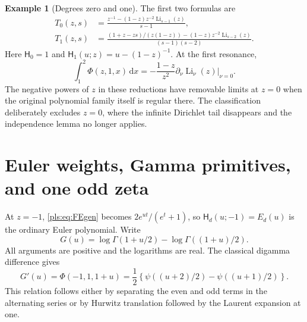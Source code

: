 \documentclass[11pt,letterpaper]{article}
\numberwithin{equation}{section}
\theoremstyle{definition}
\newtheorem{example}[theorem]{Example}
\theoremstyle{remark}\newtheorem{remark}[theorem]{Remark}
\newcommand{\dd}{\,\mathrm d}
\newcommand{\Li}{\operatorname{Li}}
\newcommand{\HFE}{\mathsf H}
\begin{document}
\begin{example}[Degrees zero and one]
The first two formulas are
\begin{align}
 T_0(z,s)&=\frac{z^{-1}-(1-z)z^{-2}\Li_{s-1}(z)}{s-1},
                                  \label{pls:eq:d0}\\
 T_1(z,s)&=\frac{(1+z-zs)/(z(1-z))
                      -(1-z)z^{-2}\Li_{s-2}(z)}{(s-1)(s-2)}.
                                  \label{pls:eq:d1}
\end{align}
Here $\HFE_0=1$ and $\HFE_1(u;z)=u-(1-z)^{-1}$.
At the first resonance,
\begin{equation}\label{pls:eq:d0res}
 \int_1^2\Phi(z,1,x)\dd x
       =-\frac{1-z}{z^2}
                       \left.\partial_\nu\Li_\nu(z)\right|_{\nu=0}.
\end{equation}
The negative powers of $z$ in these reductions have removable limits
at $z=0$ when the original polynomial family itself is regular there.
The classification deliberately excludes $z=0$, where the infinite
Dirichlet tail disappears and the independence lemma no longer applies.
\end{example}

\section{Euler weights, Gamma primitives, and one odd zeta}
\label{pls:sec:gamma}

At $z=-1$, \eqref{pls:eq:FEgen} becomes
$2e^{ut}/(e^t+1)$, so $\HFE_d(u;-1)=E_d(u)$ is the ordinary
Euler polynomial. Write
\begin{equation}\label{pls:eq:G}
 G(u)=\log\Gamma(1+u/2)-\log\Gamma((1+u)/2).
\end{equation}
All arguments are positive and the logarithms are real. The classical
digamma difference gives \cite{DLMFPsi,DLMFHurwitz}
\begin{equation}\label{pls:eq:Gprime}
 G'(u)=\Phi(-1,1,1+u)
       =\frac12\left\{\psi((u+2)/2)-\psi((u+1)/2)\right\}.
\end{equation}
This relation follows either by separating the even and odd terms
in the alternating series or by Hurwitz translation followed by the
Laurent expansion at one.
\end{document}
